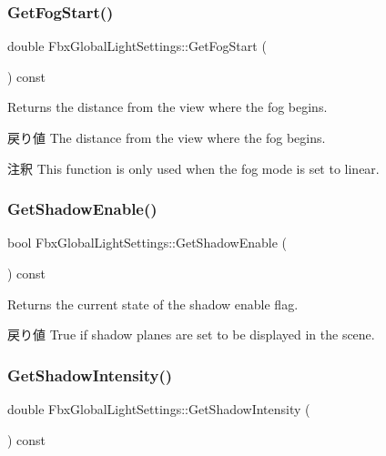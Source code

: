 \subsubsection{\texorpdfstring{Get\+Fog\+Start()}{GetFogStart()}}
{\footnotesize\ttfamily double Fbx\+Global\+Light\+Settings\+::\+Get\+Fog\+Start (\begin{DoxyParamCaption}{ }\end{DoxyParamCaption}) const}

Returns the distance from the view where the fog begins. \begin{DoxyReturn}{戻り値}
The distance from the view where the fog begins. 
\end{DoxyReturn}
\begin{DoxyRemark}{注釈}
This function is only used when the fog mode is set to linear. 
\end{DoxyRemark}
\mbox{\label{class_fbx_global_light_settings_afd139497270cca9fd2deaa03e2ec1fe7}} 
\subsubsection{\texorpdfstring{Get\+Shadow\+Enable()}{GetShadowEnable()}}
{\footnotesize\ttfamily bool Fbx\+Global\+Light\+Settings\+::\+Get\+Shadow\+Enable (\begin{DoxyParamCaption}{ }\end{DoxyParamCaption}) const}

Returns the current state of the shadow enable flag. \begin{DoxyReturn}{戻り値}
{\ttfamily True} if shadow planes are set to be displayed in the scene. 
\end{DoxyReturn}
\mbox{\label{class_fbx_global_light_settings_a86101dda291ce7b103a7fe77ecb0a876}} 
\subsubsection{\texorpdfstring{Get\+Shadow\+Intensity()}{GetShadowIntensity()}}
{\footnotesize\ttfamily double Fbx\+Global\+Light\+Settings\+::\+Get\+Shadow\+Intensity (\begin{DoxyParamCaption}{ }\end{DoxyParamCaption}) const}

